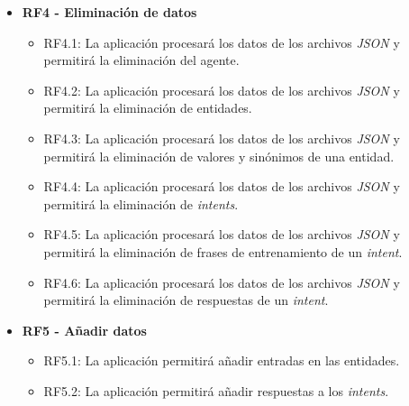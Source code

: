 \begin{itemize}
    \item \textbf{RF4 - Eliminación de datos}
    \begin{itemize}
        \item RF4.1: La aplicación procesará los datos de los archivos \textit{JSON} y permitirá la eliminación del agente.
        \item RF4.2: La aplicación procesará los datos de los archivos \textit{JSON} y permitirá la eliminación de entidades.
        \item RF4.3: La aplicación procesará los datos de los archivos \textit{JSON} y permitirá la eliminación de valores y sinónimos de una entidad.
        \item RF4.4: La aplicación procesará los datos de los archivos \textit{JSON} y permitirá la eliminación de \textit{intents}.
        \item RF4.5: La aplicación procesará los datos de los archivos \textit{JSON} y permitirá la eliminación de frases de entrenamiento de un \textit{intent}.
        \item RF4.6: La aplicación procesará los datos de los archivos \textit{JSON} y permitirá la eliminación de respuestas de un \textit{intent}.
    \end{itemize}

    \item \textbf{RF5 - Añadir datos}
    \begin{itemize}
        \item RF5.1: La aplicación permitirá añadir entradas en las entidades.
        \item RF5.2: La aplicación permitirá añadir respuestas a los \textit{intents}.
    \end{itemize}


\end{itemize}
